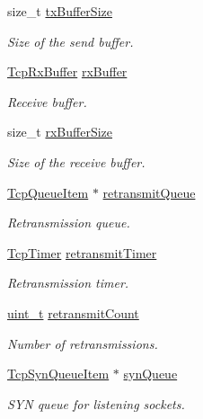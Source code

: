\begin{DoxyCompactItemize}
size\+\_\+t \hyperlink{struct__Socket_a42c544e1021a6d8b0f270edcf40d7c51}{tx\+Buffer\+Size}
\begin{DoxyCompactList}\small\item\em Size of the send buffer. \end{DoxyCompactList}\item 
\hyperlink{structTcpRxBuffer}{Tcp\+Rx\+Buffer} \hyperlink{struct__Socket_af51421eecdfec26a8203db084bcc26c6}{rx\+Buffer}
\begin{DoxyCompactList}\small\item\em Receive buffer. \end{DoxyCompactList}\item 
size\+\_\+t \hyperlink{struct__Socket_ab150d0bcff037a5601a105102927dfa3}{rx\+Buffer\+Size}
\begin{DoxyCompactList}\small\item\em Size of the receive buffer. \end{DoxyCompactList}\item 
\hyperlink{tcp_8h_acfab1d17433f464b8b01a6fbb186bb9e}{Tcp\+Queue\+Item} $\ast$ \hyperlink{struct__Socket_aacd913f1fdecfe01397a5e47534f48a2}{retransmit\+Queue}
\begin{DoxyCompactList}\small\item\em Retransmission queue. \end{DoxyCompactList}\item 
\hyperlink{structTcpTimer}{Tcp\+Timer} \hyperlink{struct__Socket_a629026470a722cf45d880c64a3d3b7a0}{retransmit\+Timer}
\begin{DoxyCompactList}\small\item\em Retransmission timer. \end{DoxyCompactList}\item 
\hyperlink{compiler__port_8h_a12a1e9b3ce141648783a82445d02b58d}{uint\+\_\+t} \hyperlink{struct__Socket_a0bdf1bfdb2056693997c2ecbc4f054a2}{retransmit\+Count}
\begin{DoxyCompactList}\small\item\em Number of retransmissions. \end{DoxyCompactList}\item 
\hyperlink{tcp_8h_a933e3439a35c2a8994d9de8f460cc5b1}{Tcp\+Syn\+Queue\+Item} $\ast$ \hyperlink{struct__Socket_a8d6a6d8db31df012cf49443c421865a8}{syn\+Queue}
\begin{DoxyCompactList}\small\item\em S\+YN queue for listening sockets. \end{DoxyCompactList}\item 

\end{DoxyCompactItemize}
